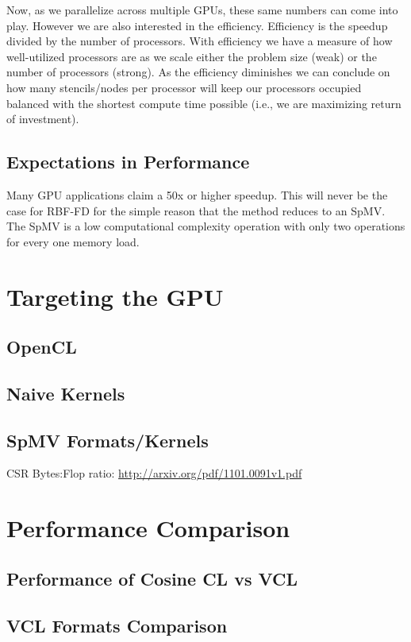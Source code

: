 \documentclass{report}
\begin{document}
Now, as we parallelize across multiple GPUs, these same numbers can come into
play. However we are also interested in the efficiency. Efficiency is the
speedup divided by the number of processors. With efficiency we have a measure
of how well-utilized processors are as we scale either the problem size (weak)
or the number of processors (strong). As the efficiency diminishes we can
conclude on how many stencils/nodes per processor will keep our processors
occupied balanced with the shortest compute time possible (i.e., we are
maximizing return of investment). 

\subsection{Expectations in Performance}
Many GPU applications claim a 50x or higher speedup. This will never be the case for RBF-FD for the simple reason that the method reduces to an SpMV. The SpMV is a low computational complexity operation with only two operations for every one memory load. 


\section{Targeting the GPU}

\subsection{OpenCL}
\subsection{Naive Kernels}
\subsection{SpMV Formats/Kernels}

CSR Bytes:Flop ratio: \url{http://arxiv.org/pdf/1101.0091v1.pdf}

\section{Performance Comparison}
\subsection{Performance of Cosine CL vs VCL}
\subsection{VCL Formats Comparison}
\end{document}
